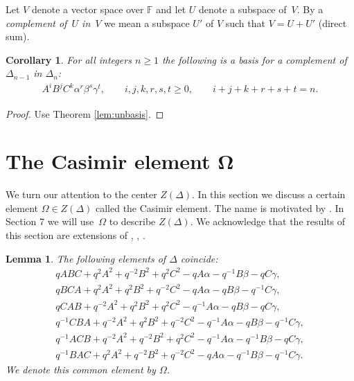 \documentclass[11pt]{article}
\numberwithin{equation}{section}
\newtheorem{Corollary}[Theorem]{Corollary}
\newtheorem{Lemma}[Theorem]{Lemma}
\begin{document}
  Let $V$ denote a vector space over
$\mathbb F$ and let $U$ denote a subspace of~$V$.
By a {\it complement of~$U$ in~$V$} we mean
a subspace $U'$ of $V$ such that
$V=U+U'$ (direct sum).


\begin{Corollary}
\label{lem:com}
For all integers $n\geq 1$ the following is a basis
for a complement of $\Delta_{n-1}$ in $\Delta_n$:
\begin{gather*}
A^iB^jC^k\alpha^r \beta^s \gamma^t, \qquad
i,j,k,r,s,t\geq 0, \qquad
i+j+k+r+s+t = n.
\end{gather*}
\end{Corollary}
\begin{proof}
Use Theorem
\ref{lem:unbasis}.
\end{proof}



\section[The Casimir element $\Omega$]{The Casimir element $\boldsymbol{\Omega}$}

We turn our attention to the center $Z(\Delta)$.
In this section we discuss a certain
 element $\Omega \in Z(\Delta)$
 called the Casimir element.
The name is
motivated by
\cite[equation~(1.3)]{Zhidd}.
 In Section 7
we will use~$\Omega$ to describe
$Z(\Delta)$.
We acknowledge that the results of this section are
extensions of
\cite[Lemma~1]{posta2},
\cite[Section~6]{koro},
\cite[equation~(1.3)]{Zhidd}.

\begin{Lemma}
\label{lem:six}
The following elements of $\Delta $ coincide:
\begin{gather*}
qABC + q^2A^2+q^{-2}B^2+q^2C^2-q A\alpha -q^{-1} B\beta -q C\gamma,
\\
qBCA +
q^2A^2 +
q^2B^2+q^{-2}C^2
-q A\alpha
-qB\beta -q^{-1}C\gamma,
\\
qCAB +
q^{-2}A^2+q^2B^2
+q^2 C^2
-q^{-1} A\alpha -q B \beta
-q C\gamma,
\\
q^{-1}CBA + q^{-2}A^2+q^{2}B^2+q^{-2}C^2-q^{-1}A\alpha -q B\beta -
q^{-1} C\gamma,
\\
q^{-1}ACB +
q^{-2}A^2 +
q^{-2}B^2+q^{2}C^2
-q^{-1} A\alpha
-q^{-1}B\beta -q C\gamma,
\\
q^{-1}BAC +
q^{2}A^2+q^{-2}B^2
+q^{-2}C^2
-q A\alpha
-q^{-1} B \beta
-q^{-1} C\gamma.
\end{gather*}
We denote this common element by $\Omega$.
\end{Lemma}
\end{document}
